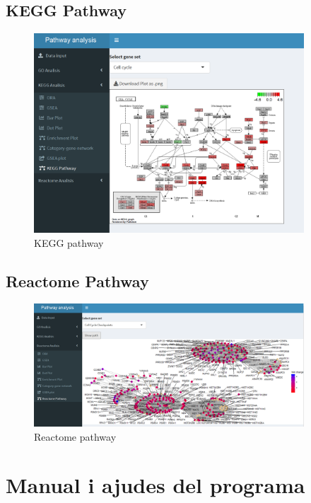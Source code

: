 \subsection{\gls{KEGG} Pathway}


\begin{figure}[H]
\centering
\includegraphics[width=0.9\textwidth]{figures/App_F20_Items_KEGG_KEGGPathway.png} 
\caption{\gls{KEGG} pathway}
\end{figure}

\subsection{Reactome Pathway}

\begin{figure}[H]
\centering
\includegraphics[width=0.9\textwidth]{figures/App_F21_Items_RA_RAPathway.png} 
\caption{Reactome pathway}
\end{figure}


\section{Manual i ajudes del programa}


